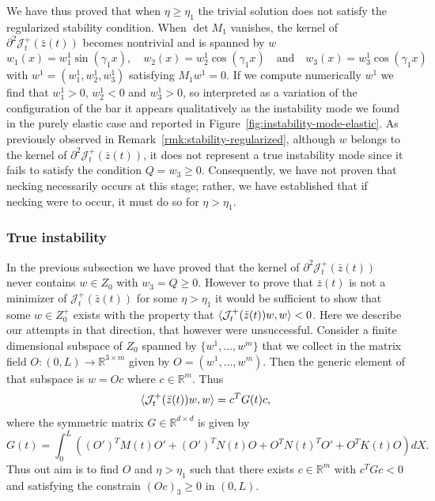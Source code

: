 \documentclass[a4paper,10pt,twoside]{amsbook}
\numberwithin{section}{chapter}
\numberwithin{equation}{chapter}
\theoremstyle{definition}
\DeclarePairedDelimiter{\dual}{\langle}{\rangle}
\begin{document}
We have thus proved that when $\eta\ge\eta_1$ the trivial solution does not satisfy the regularized stability condition. When $\det M_1$ vanishes, the kernel of $\partial^2\mathcal{J}^+_t(\bar z(t))$ becomes nontrivial and is spanned by $w$
\[
w_1(x)=w_1^1\sin(\gamma_1x),\quad w_2(x)=w_2^1\cos(\gamma_1x)\quad\text{and}\quad w_3(x)=w_3^1\cos(\gamma_1x)
\]
with $w^1=(w^1_1,w^1_2,w^1_3)$ satisfying $M_1w^1=0$. If we compute numerically $w^1$ we find that $w^1_1>0$, $w^1_2<0$ and $w^1_3>0$, so interpreted as a variation of the configuration of the bar it appears qualitatively as the instability mode we found in the purely elastic case and reported in Figure~\ref{fig:instability-mode-elastic}. As previously observed in Remark~\ref{rmk:stability-regularized}, although $w$ belongs to the kernel of $\partial^2\mathcal{J}_t^+(\bar{z}(t))$, it does not represent a true instability mode since it fails to satisfy the condition $Q=w_3\ge0$. Consequently, we have not proven that necking necessarily occurs at this stage; rather, we have established that if necking were to occur, it must do so for $\eta>\eta_1$.


\subsubsection*{True instability} In the previous subsection we have proved that the kernel of $\partial^2\mathcal{J}^+_t(\bar{z}(t))$ never contains $w\in Z_0$ with $w_3=Q\ge 0$. However to prove that $\bar{z}(t)$ is not a minimizer of $\mathcal{J}^+_t(\bar{z}(t))$ for some $\eta>\eta_1$ it would be sufficient to show that some $w\in Z_0^+$ exists with the property that $\dual{\mathcal{J}^+_t(\bar{z}(t))w,w}<0$. Here we describe our attempts in that direction, that however were unsuccessful. Consider a finite dimensional subspace of $Z_0$ spanned by $\{w^1,\dots,w^m\}$ that we collect in the matrix field $O\colon(0,L)\to\mathbb{R}^{3\times m}$ given by $O=(w^1,\dots,w^m)$. Then the generic element of that subspace is $w=Oc$ where $c\in\mathbb{R}^m$. Thus
\[
\dual{\mathcal{J}^+_t(\bar{z}(t))w,w}=c^TG(t)c,
\]
where the symmetric matrix $G\in\mathbb{R}^{d\times d}$ is given by
\[
G(t)=\int_0^L\left((O')^TM(t)O'+(O')^TN(t)O+O^TN(t)^TO'+O^TK(t)O\right)dX.
\]
Thus out aim is to find $O$ and $\eta>\eta_1$ such that there exists $c\in\mathbb{R}^{m}$ with $c^TGc<0$ and satisfying the constrain $(Oc)_3\ge0$ in $(0,L)$.
\end{document}
